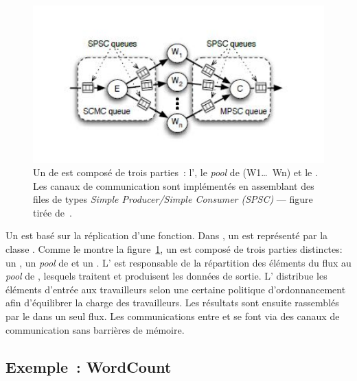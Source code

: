 \begin{figure}[ht]
\centering
     \includegraphics[width=1.0\textwidth]{Figures/FastFlowFarm.jpg}
      \caption[Les trois parties d'un  de .]{Un  de  est compos\'e de trois parties~:  l', le \emph{pool} de  (W1\ldots\ Wn) et le . Les canaux de communication sont impl\'ement\'es en assemblant des files de types \emph{Simple Producer/Simple Consumer (SPSC)} --- figure tir\'ee de~\cite{aldinucci2010efficient}.}
       \label{FastFlowFarm.fig}
\end{figure}

Un  est bas\'e sur la r\'eplication d'une fonction. Dans , un  est repr\'esent\'e par la classe . Comme le montre la figure~\ref{FastFlowFarm.fig}, un  est compos\'e de trois parties distinctes: un , un  \emph{pool} de  et un . L' est responsable de la r\'epartition des \'el\'ements du flux au \emph{pool} de , lesquels traitent et produisent les donn\'ees de sortie. L' distribue les \'el\'ements d'entr\'ee aux travailleurs selon une certaine politique d'ordonnancement afin d'\'equilibrer la charge des travailleurs. Les r\'esultats sont ensuite rassembl\'es par le  dans un seul flux. Les communications entre  et  se font via des canaux de communication sans barri\`eres de m\'emoire.


\subsection{Exemple~: WordCount}


